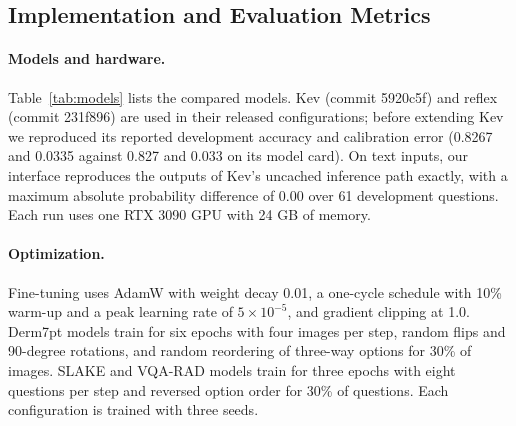 \documentclass{article}
\begin{document}
\subsection{Implementation and Evaluation Metrics}
\begin{table}[t]
\centering
\caption{Compared models. Only reflex and the 4B label reader share a backbone; Kev is built on the Qwen3.5 Base checkpoints. The 0.8B label reader was not run on PubMedQA.}
\label{tab:models}
\small
{}
\end{table}

\paragraph{Models and hardware.} Table~\ref{tab:models} lists the compared models. Kev (commit 5920c5f) and reflex (commit 231f896) are used in their released configurations; before extending Kev we reproduced its reported development accuracy and calibration error (0.8267 and 0.0335 against 0.827 and 0.033 on its model card). On text inputs, our interface reproduces the outputs of Kev's uncached inference path exactly, with a maximum absolute probability difference of $0.00$ over 61 development questions. Each run uses one RTX 3090 GPU with 24 GB of memory.

\paragraph{Optimization.} Fine-tuning uses AdamW with weight decay 0.01, a one-cycle schedule with 10\% warm-up and a peak learning rate of $5\times10^{-5}$, and gradient clipping at 1.0. Derm7pt models train for six epochs with four images per step, random flips and 90-degree rotations, and random reordering of three-way options for 30\% of images. SLAKE and VQA-RAD models train for three epochs with eight questions per step and reversed option order for 30\% of questions. Each configuration is trained with three seeds.
\end{document}
